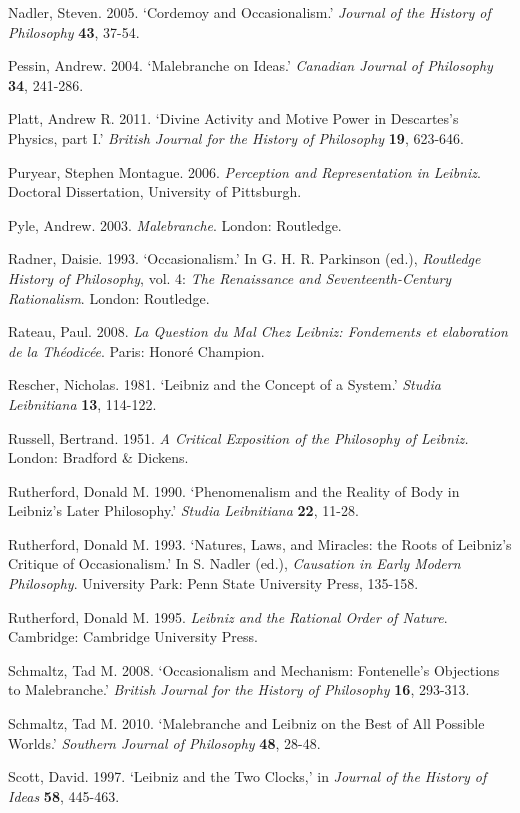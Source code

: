\documentclass{article}
\begin{document}
Nadler, Steven. 2005. `Cordemoy and Occasionalism.' \emph{Journal of the
History of Philosophy} \textbf{43}, 37-54.

Pessin, Andrew. 2004. `Malebranche on Ideas.' \emph{Canadian Journal of
Philosophy} \textbf{34}, 241-286.

Platt, Andrew R. 2011. `Divine Activity and Motive Power in Descartes's
Physics, part I.' \emph{British Journal for the History of Philosophy}
\textbf{19}, 623-646.

Puryear, Stephen Montague. 2006. \emph{Perception and Representation in
Leibniz}. Doctoral Dissertation, University of Pittsburgh.

Pyle, Andrew. 2003. \emph{Malebranche}. London: Routledge.

Radner, Daisie. 1993. `Occasionalism.' In G. H. R. Parkinson (ed.),
\emph{Routledge History of Philosophy}, vol. 4: \emph{The Renaissance
and Seventeenth-Century Rationalism}. London: Routledge.

Rateau, Paul. 2008. \emph{La Question du Mal Chez Leibniz: Fondements et
elaboration de la Théodicée}. Paris: Honoré Champion.

Rescher, Nicholas. 1981. `Leibniz and the Concept of a System.'
\emph{Studia Leibnitiana} \textbf{13}, 114-122.

Russell, Bertrand. 1951. \emph{A Critical Exposition of the Philosophy
of Leibniz.} London: Bradford \& Dickens.

Rutherford, Donald M. 1990. `Phenomenalism and the Reality of Body in
Leibniz's Later Philosophy.' \emph{Studia Leibnitiana} \textbf{22},
11-28.

Rutherford, Donald M. 1993. `Natures, Laws, and Miracles: the Roots of
Leibniz's Critique of Occasionalism.' In S. Nadler (ed.),
\emph{Causation in Early Modern Philosophy}. University Park: Penn State
University Press, 135-158.

Rutherford, Donald M. 1995. \emph{Leibniz and the Rational Order of
Nature}. Cambridge: Cambridge University Press.

Schmaltz, Tad M. 2008. `Occasionalism and Mechanism: Fontenelle's
Objections to Malebranche.' \emph{British Journal for the History of
Philosophy} \textbf{16}, 293-313.

Schmaltz, Tad M. 2010. `Malebranche and Leibniz on the Best of All
Possible Worlds.' \emph{Southern Journal of Philosophy} \textbf{48},
28-48.

Scott, David. 1997. `Leibniz and the Two Clocks,' in \emph{Journal of
the History of Ideas} \textbf{58}, 445-463.
\end{document}

